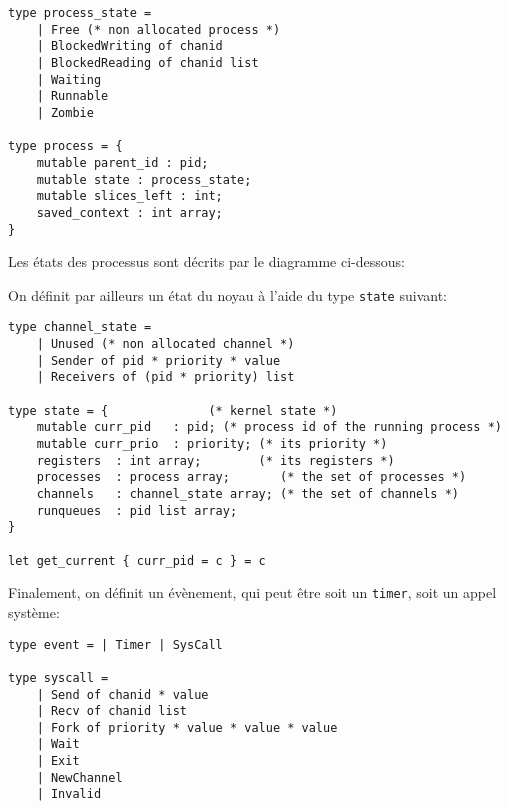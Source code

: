 \documentclass[french, toc]{../cs-classes/cs-classes}
\begin{document}
\begin{verbatim}
type process_state =
    | Free (* non allocated process *)
    | BlockedWriting of chanid
    | BlockedReading of chanid list
    | Waiting
    | Runnable
    | Zombie

type process = {
    mutable parent_id : pid;
    mutable state : process_state;
    mutable slices_left : int;
    saved_context : int array;
}
\end{verbatim}

\noindent Les états des processus sont décrits par le diagramme ci-dessous:

\noindent On définit par ailleurs un état du noyau à l'aide du type \texttt{state} suivant:
\begin{verbatim}
type channel_state =
    | Unused (* non allocated channel *)
    | Sender of pid * priority * value
    | Receivers of (pid * priority) list

type state = {              (* kernel state *)
    mutable curr_pid   : pid; (* process id of the running process *)
    mutable curr_prio  : priority; (* its priority *)
    registers  : int array;        (* its registers *)
    processes  : process array;       (* the set of processes *)
    channels   : channel_state array; (* the set of channels *)
    runqueues  : pid list array;
}

let get_current { curr_pid = c } = c
\end{verbatim}

\noindent Finalement, on définit un évènement, qui peut être soit un \texttt{timer}, soit un appel système:
\begin{verbatim}
type event = | Timer | SysCall

type syscall =
    | Send of chanid * value
    | Recv of chanid list
    | Fork of priority * value * value * value
    | Wait
    | Exit
    | NewChannel
    | Invalid
\end{verbatim}
\end{document}
